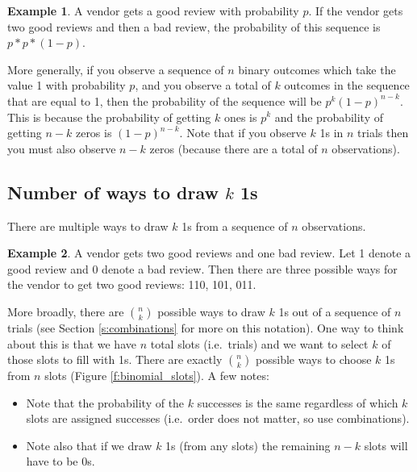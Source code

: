 \documentclass[]{article}
\theoremstyle{definition}
\newtheorem{exmp}{Example}[section]
\begin{document}
\begin{exmp}
A vendor gets a good review with probability $p$. If the vendor gets two good reviews and then a bad review, the probability of this sequence is $p * p * (1-p)$.
\end{exmp}

More generally, if you observe a sequence of $n$ binary outcomes which take the value 1 with probability $p$, and you observe a total of $k$ outcomes in the sequence that are equal to 1, then the probability of the sequence will be $p^k (1-p)^{n-k}$. This is because the probability of getting $k$ ones is $p^k$ and the probability of getting $n-k$ zeros is $(1-p)^{n-k}$. Note that if you observe $k$ 1s in $n$ trials then you must also observe $n-k$ zeros (because there are a total of $n$ observations).

 \subsection{Number of ways to draw $k$ 1s}
 
There are multiple ways to draw $k$ 1s from a sequence of $n$ observations. 

\begin{exmp}
A vendor gets two good reviews and one bad review. Let 1 denote a good review and 0 denote a bad review. Then there are three possible ways for the vendor to get two good reviews: 110, 101, 011.
\end{exmp}

\noindent More broadly, there are $n \choose k$ possible ways to draw $k$ 1s out of a sequence of $n$ trials (see Section \ref{s:combinations} for more on this notation). One way to think about this is that we have $n$ total slots (i.e.\ trials) and we want to select $k$ of those slots to fill with 1s. There are exactly $n \choose k$ possible ways to choose $k$ 1s from $n$ slots (Figure \ref{f:binomial_slots}). A few notes:
\begin{itemize}
\item Note that the probability of the $k$ successes is the same regardless of which $k$ slots are assigned successes (i.e.\ order does not matter, so use combinations).
\item Note also that if we draw $k$ 1s (from any slots) the remaining $n-k$ slots will have to be 0s.
\end{itemize}
\end{document}
